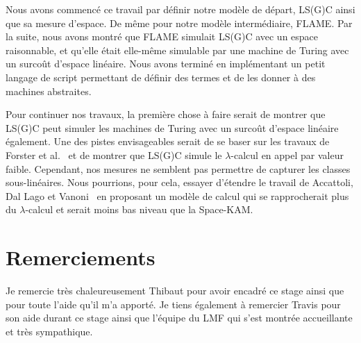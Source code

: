 \documentclass[a4paper, 11pt]{article}
\theoremstyle{definition}
\begin{document}
Nous avons commencé ce travail par définir notre modèle de départ, LS(G)C ainsi que sa mesure d'espace. De même pour notre modèle intermédiaire, FLAME.
Par la suite, nous avons montré que FLAME simulait LS(G)C avec un espace raisonnable, et qu'elle était elle-même simulable par une machine de Turing avec un surcoût d'espace linéaire.
Nous avons terminé en implémentant un petit langage de script permettant de définir des termes et de les donner à des machines abstraites.

Pour continuer nos travaux, la première chose à faire serait de montrer que LS(G)C peut simuler les machines de Turing avec un surcoût d'espace linéaire également.
Une des pistes envisageables serait de se baser sur les travaux de Forster et al.~\cite{forster2019weak} et de montrer que LS(G)C simule le $\lambda$-calcul en appel par valeur faible.
Cependant, nos mesures ne semblent pas permettre de capturer les classes sous-linéaires. 
Nous pourrions, pour cela, essayer d'étendre le travail de Accattoli, Dal Lago et Vanoni~\cite{accattoli2022reasonable} en proposant un modèle de calcul qui se rapprocherait plus du $\lambda$-calcul et serait moins bas niveau que la Space-KAM.
\section{Remerciements}
Je remercie très chaleureusement Thibaut pour avoir encadré ce stage ainsi que pour toute l'aide qu'il m'a apporté. 
Je tiens également à remercier Travis pour son aide durant ce stage ainsi que l'équipe du LMF qui s'est montrée accueillante et très sympathique.

\end{document}
